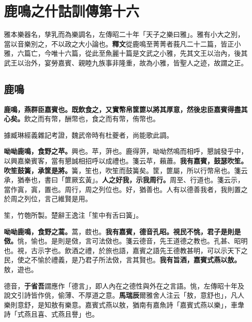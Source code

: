 \chapter{鹿鳴之什詁訓傳第十六}

\begin{quoting}雅本樂器名，孳乳而為樂調名，左傳昭二十年「天子之樂曰雅」。雅有小大之別，當以音樂別之，不以政之大小論也。\textbf{釋文}從鹿鳴至菁菁者莪凡二十二篇，皆正小雅，六篇亡，今唯十六篇，從此至魚麗十篇是文武之小雅，先其文王以治內，後其武王以治外，宴勞嘉賓、親睦九族事非隆重，故為小雅，皆聖人之迹，故謂之正。\end{quoting}

\section{鹿鳴}


\textbf{鹿鳴，燕群臣嘉賓也。既飲食之，又實幣帛筐篚以將其厚意，然後忠臣嘉賓得盡其心矣。}{\footnotesize 飲之而有幣，酬幣也，食之而有幣，侑幣也。}

\begin{quoting}據臧琳經義雜記考證，魏武帝時有杜夔者，尚能歌此調。\end{quoting}

\textbf{呦呦鹿鳴，食野之苹。}{\footnotesize 興也。苹，蓱也。鹿得蓱，呦呦然鳴而相呼，懇誠發乎中，以興嘉樂賓客，當有懇誠相招呼以成禮也。箋云苹，藾蕭。}\textbf{我有嘉賓，鼓瑟吹笙。吹笙鼓簧，承筐是將。}{\footnotesize 簧，笙也，吹笙而鼓簧矣。筐，篚屬，所以行幣帛也。箋云承，猶奉也，書曰「篚厥玄黃」。}\textbf{人之好我，示我周行。}{\footnotesize 周至、行道也。箋云示，當作寘，寘，置也。周行，周之列位也。好，猶善也。人有以德善我者，我則置之於周之列位，言己維賢是用。}

\begin{quoting}笙，竹匏所製。楚辭王逸注「笙中有舌曰簧」。\end{quoting}

\textbf{呦呦鹿鳴，食野之蒿。}{\footnotesize 蒿，菣也。}\textbf{我有嘉賓，德音孔昭。視民不恌，君子是則是傚。}{\footnotesize 恌，愉也。是則是傚，言可法傚也。箋云德音，先王道德之教也。孔甚、昭明也。視，古示字也。飲酒之禮，於旅也語，嘉賓之語先王德教甚明，可以示天下之民，使之不愉於禮義，是乃君子所法傚，言其賢也。}\textbf{我有旨酒，嘉賓式燕以敖。}{\footnotesize 敖，遊也。}

\begin{quoting}德音，\textbf{于省吾}謂應作「德言」，即人內在之德性與外在之言語。恌，左傳昭十年及說文引詩皆作佻，偷薄、不厚道之意。\textbf{馬瑞辰}爾雅舍人注云「敖，意舒也」，凡人樂則意舒，是知敖有樂意。嘉賓式燕以敖，猶南有嘉魚詩「嘉賓式燕以樂」，車舝詩「式燕且喜、式燕且譽」也。\end{quoting}

